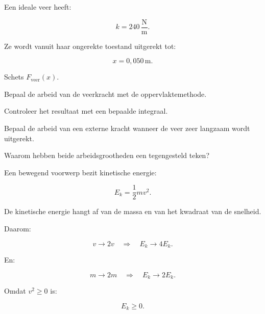 \documentclass{ximera}
\begin{document}
\begin{oefening}{\oefU\ESS}

Een ideale veer heeft:

\[
k=240\,\mathrm{\frac Nm}.
\]

Ze wordt vanuit haar ongerekte toestand uitgerekt tot:

\[
x=0{,}050\,\mathrm m.
\]

\begin{question}
Schets $F_{\mathrm{veer}}(x)$.
\end{question}

\begin{question}
Bepaal de arbeid van de veerkracht met de oppervlaktemethode.
\end{question}

\begin{question}
Controleer het resultaat met een bepaalde integraal.
\end{question}

\begin{question}
Bepaal de arbeid van een externe kracht wanneer de veer zeer langzaam wordt
uitgerekt.
\end{question}

\begin{question}
Waarom hebben beide arbeidsgrootheden een tegengesteld teken?
\end{question}

\end{oefening}



Een bewegend voorwerp bezit kinetische energie:

\[
\boxed{
E_k=\frac12mv^2.
}
\]

De kinetische energie hangt af van de massa en van het kwadraat van de
snelheid.

Daarom:

\[
v\rightarrow2v
\quad\Rightarrow\quad
E_k\rightarrow4E_k.
\]

En:

\[
m\rightarrow2m
\quad\Rightarrow\quad
E_k\rightarrow2E_k.
\]

Omdat $v^2\geq0$ is:

\[
E_k\geq0.
\]
\end{document}
